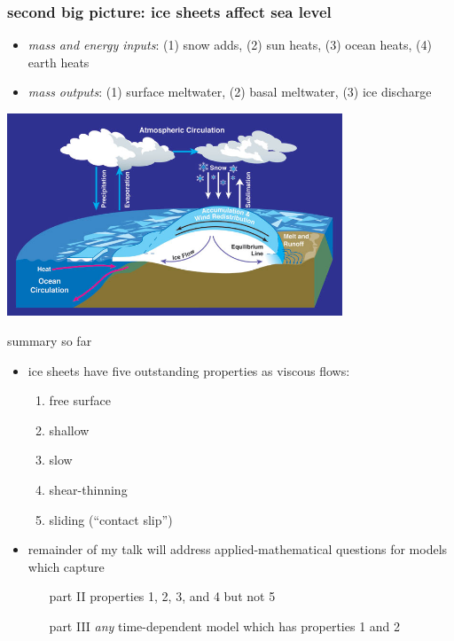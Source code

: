 \documentclass[hide notes,intlimits]{beamer}
\begin{document}
\begin{frame}
  \frametitle{second big picture: ice sheets affect sea level}
\medskip
\small
\begin{itemize}
\item \emph{mass and energy inputs}: (1) snow adds, (2) sun heats, (3) ocean heats, (4) earth heats
\item \emph{mass outputs}: (1) surface meltwater, (2) basal meltwater, (3) ice discharge
\end{itemize}
\begin{center}
  \includegraphics[width=0.75\textwidth]{mass-bal-atmos}
\end{center}
\end{frame}


\begin{frame}{summary so far}
\begin{itemize}
\item ice sheets have five outstanding properties as viscous flows:
  \begin{enumerate}
  \item \alert{free surface}
  \item \alert{shallow}
  \item \alert{slow}
  \item \alert{shear-thinning}
  \item \alert{sliding (``contact slip'')}
  \end{enumerate}
\item remainder of my talk will address applied-mathematical questions for models which capture
  \begin{itemize}
  \item[part II] properties 1, 2, 3, and 4 but not 5
  \item[part III] \emph{any} time-dependent model which has properties 1 and 2
  \end{itemize}
\end{itemize}
\end{frame}
\end{document}
